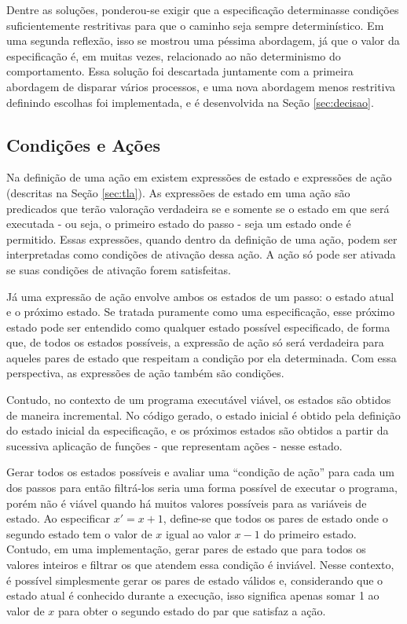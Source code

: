 Dentre as soluções, ponderou-se exigir que a especificação determinasse
condições suficientemente restritivas para que o caminho seja sempre
determinístico. Em uma segunda reflexão, isso se mostrou uma péssima abordagem,
já que o valor da especificação é, em muitas vezes, relacionado ao não
determinismo do comportamento. Essa solução foi descartada juntamente com a
primeira abordagem de disparar vários processos, e uma nova abordagem menos
restritiva definindo
escolhas foi implementada, e é desenvolvida na Seção \ref{sec:decisao}. 

\subsection{Condições e Ações}
\label{sec:condicoes}

Na definição de uma ação em \TLAA existem expressões de estado e expressões de
ação (descritas na Seção \ref{sec:tla}). As expressões de estado em uma ação
\FANCYA são predicados que terão valoração verdadeira se e somente se o estado em que \FANCYA
será executada - ou seja, o primeiro estado do passo - seja um estado onde
\FANCYA é permitido. Essas expressões, quando dentro da definição de uma ação,
podem ser interpretadas como condições de ativação dessa ação. A ação só pode ser ativada
se suas condições de ativação forem satisfeitas.

Já uma expressão de ação envolve ambos os estados de um passo: o estado atual e
o próximo estado. Se tratada puramente como uma especificação, esse próximo
estado pode ser entendido como qualquer estado possível especificado, de forma
que, de todos os estados possíveis, a expressão de ação só será verdadeira para
aqueles pares de estado que respeitam a condição por ela determinada. Com essa
perspectiva, as expressões de ação também são condições.

Contudo, no contexto de um programa executável viável, os estados são obtidos de
maneira incremental. No código gerado, o estado inicial é obtido pela definição
do estado inicial da especificação, e os próximos estados são obtidos a partir
da sucessiva aplicação de funções - que representam ações - nesse estado.

Gerar todos os estados possíveis e avaliar uma ``condição de ação'' para cada um dos
passos para então filtrá-los seria uma forma possível de executar o programa, porém
não é viável quando há muitos valores possíveis para as variáveis de estado. Ao
especificar $x' = x + 1$, define-se que todos os pares de estado onde o segundo estado tem o
valor de $x$ igual ao valor $x - 1$ do primeiro estado. Contudo, em uma
implementação, gerar pares de estado que para todos os valores
inteiros e filtrar os que atendem essa condição é
inviável. Nesse contexto, é possível simplesmente gerar os pares de estado válidos e,
considerando que o estado atual é conhecido durante a execução, isso significa apenas
somar 1 ao valor de $x$ para obter o segundo estado do par que satisfaz a ação.

